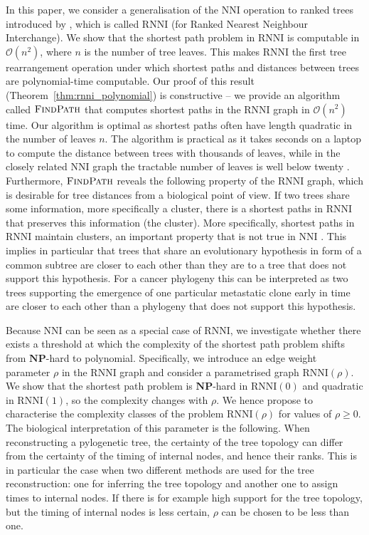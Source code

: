 \documentclass[11pt]{amsart}
\newcommand{\rnni}{\mathrm{RNNI}}
\newcommand{\findpath}{\textsc{FindPath}}
\newcommand{\nni}{\mathrm{NNI}}
\newcommand{\np}{\mathbf{NP}}
\renewcommand{\O}{\mathcal O}
\begin{document}
In this paper, we consider a generalisation of the $\nni$ operation to ranked trees introduced by \textcite{Gavryushkin2018-ol}, which is called $\rnni$ (for Ranked Nearest Neighbour Interchange).
We show that the shortest path problem in $\rnni$ is computable in $\O(n^2)$, where $n$ is the number of tree leaves.
This makes $\rnni$ the first tree rearrangement operation under which shortest paths and distances between trees are polynomial-time computable.
Our proof of this result (Theorem~\ref{thm:rnni_polynomial}) is constructive -- we provide an algorithm called $\findpath$ that computes shortest paths in the $\rnni$ graph in $\O(n^2)$ time.
Our algorithm is optimal as shortest paths often have length quadratic in the number of leaves $n$.
The algorithm is practical as it takes seconds on a laptop to compute the distance between trees with thousands of leaves, while in the closely related $\nni$ graph the tractable number of leaves is well below twenty \autocite{Li1996-zw, Whidden2016-kl}.
Furthermore, $\findpath$ reveals the following property of the $\rnni$ graph, which is desirable for tree distances from a biological point of view.
If two trees share some information, more specifically a cluster, there is a shortest paths in $\rnni$ that preserves this information (the cluster).
More specifically, shortest paths in $\rnni$ maintain clusters, an important property that is not true in $\nni$ \autocite{Li1996-zw}.
This implies in particular that trees that share an evolutionary hypothesis in form of a common subtree are closer to each other than they are to a tree that does not support this hypothesis.
For a cancer phylogeny this can be interpreted as two trees supporting the emergence of one particular metastatic clone early in time are closer to each other than a phylogeny that does not support this hypothesis.

Because $\nni$ can be seen as a special case of $\rnni$, we investigate whether there exists a threshold at which the complexity of the shortest path problem shifts from $\np$-hard to polynomial.
Specifically, we introduce an edge weight parameter $\rho$ in the $\rnni$ graph and consider a parametrised graph $\rnni(\rho)$.
We show that the shortest path problem is $\np$-hard in $\rnni(0)$ and quadratic in $\rnni(1)$, so the complexity changes with $\rho$.
We hence propose to characterise the complexity classes of the problem $\rnni(\rho)$ for values of $\rho \geq 0$.
The biological interpretation of this parameter is the following.
When reconstructing a pylogenetic tree, the certainty of the tree topology can differ from the certainty of the timing of internal nodes, and hence their ranks.
This is in particular the case when two different methods are used for the tree reconstruction: one for inferring the tree topology and another one to assign times to internal nodes.
If there is for example high support for the tree topology, but the timing of internal nodes is less certain, $\rho$ can be chosen to be less than one.
\end{document}
